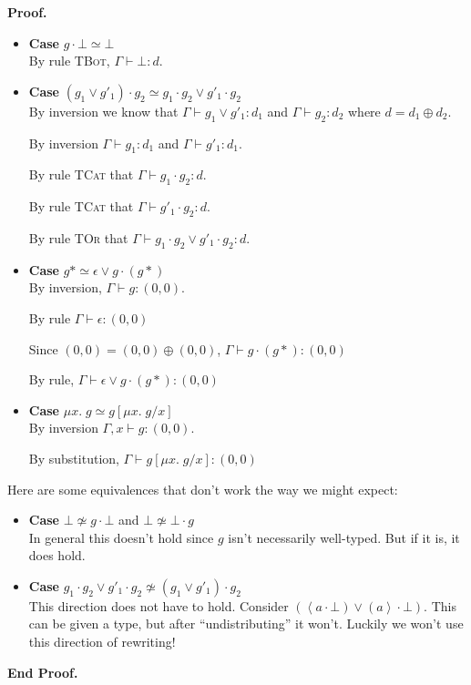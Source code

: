 \documentclass{article}
\newcommand{\fix}[2]{\mu {#1}.\;{#2}}
\newcommand{\lft}[1]{\left<{#1}\right.}
\newcommand{\rgt}[1]{\left.{#1}\right>}
\newcommand{\judgebalance}[3][\Gamma]{{#1} \vdash {#2} : {#3}}
\newcommand{\combine}[2]{{#1} \oplus {#2}}
\newcommand{\zero}{(0,0)}
\newenvironment{proof}{\noindent\textbf{Proof.}}{\noindent\textbf{End Proof.}}
\newenvironment{caseblock}{\begin{itemize}}{\end{itemize}}
\newenvironment{case}[1]{\item \textbf{Case} {#1}\\}{}
\begin{document}
\begin{proof}
\begin{caseblock}
    \begin{case}{$g \cdot \bot \simeq \bot$}
      By rule \textsc{TBot}, $\judgebalance{\bot}{d}$.
    \end{case}

    \begin{case}{$(g_1 \vee g'_1)\cdot g_2 \simeq g_1\cdot g_2 \vee g'_1\cdot g_2$}
      By inversion we know that $\judgebalance{g_1 \vee g'_1}{d_1}$ and 
      $\judgebalance{g_2}{d_2}$ where $d = \combine{d_1}{d_2}$. 

      By inversion $\judgebalance{g_1}{d_1}$ and $\judgebalance{g'_1}{d_1}$.

      By rule \textsc{TCat} that $\judgebalance{g_1\cdot g_2}{d}$. 

      By rule \textsc{TCat} that $\judgebalance{g'_1\cdot g_2}{d}$. 

      By rule \textsc{TOr} that $\judgebalance{g_1\cdot g_2 \vee g'_1\cdot g_2}{d}$. 
    \end{case}

    \begin{case}{$g* \simeq \epsilon \vee g\cdot(g*)$}
      By inversion, $\judgebalance{g}{\zero}$. 

      By rule $\judgebalance{\epsilon}{\zero}$

      Since $\zero = \combine{\zero}{\zero}$, $\judgebalance{g\cdot(g*)}{\zero}$
      
      By rule, $\judgebalance{\epsilon \vee g\cdot(g*)}{\zero}$
    \end{case}

    \begin{case}{$\fix{x}{g} \simeq g[\fix{x}{g}/x]$}
      By inversion $\judgebalance[\Gamma, x]{g}{\zero}$. 

      By substitution, $\judgebalance{g[\fix{x}{g}/x]}{\zero}$
    \end{case}
  \end{caseblock}

  Here are some equivalences that don't work the way we might expect: 
  \begin{caseblock}
    \begin{case}{$\bot \not\simeq g \cdot \bot$ and $\bot \not\simeq \bot \cdot g$}
      In general this doesn't hold since $g$ isn't necessarily well-typed. But if it is,
      it does hold. 
    \end{case}

    \begin{case}{$g_1\cdot g_2 \vee g'_1\cdot g_2 \not\simeq (g_1 \vee g'_1)\cdot g_2$}
      This direction does not have to hold. Consider $(\lft{a}\cdot\bot) \vee (\rgt{a}\cdot\bot)$. 
      This can be given a type, but after ``undistributing'' it won't. Luckily we won't
      use this direction of rewriting!
    \end{case}
  \end{caseblock}
\end{proof}
\end{document}
